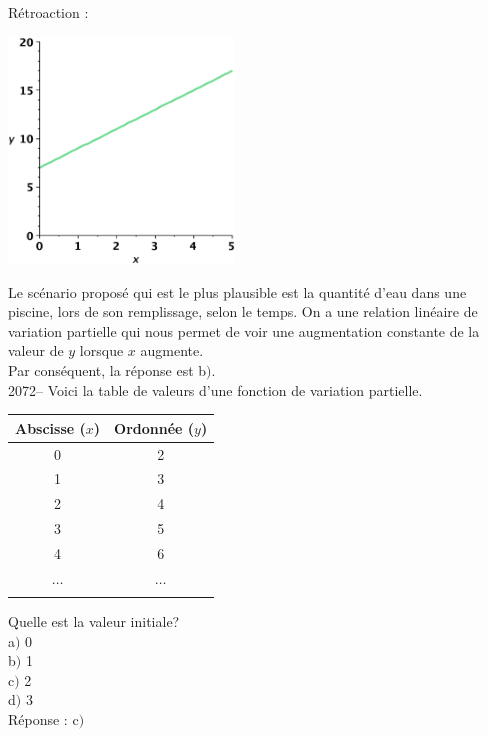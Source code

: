 \documentclass[letterpaper, 12pt]{article}
\begin{document}
R\'etroaction :\\
\begin{center}
 \includegraphics[width=6cm]{Q2071.eps}
\end{center}
Le sc\'enario propos\'e qui est le plus plausible est la quantit\'e d'eau dans une piscine, lors de son remplissage, selon le temps. On a une relation lin\'eaire de variation partielle qui nous permet de voir une augmentation constante de la valeur de $y$ lorsque $x$ augmente. \\
Par cons\'equent, la r\'eponse est b$)$.\\

2072-- Voici la table de valeurs d'une fonction de variation partielle.
\begin{center}
 \begin{tabular}{|c|c|} \hline
{\bf Abscisse ($x$)} & {\bf Ordonn\'ee ($y$)}  \\ \hline \hline
0 & 2 \\ \hline
1 & 3 \\ \hline
2 & 4 \\ \hline
3 & 5 \\ \hline
4 & 6 \\ \hline
$\ldots$ & $\ldots$ \\ \hline
\multicolumn{2}{c}{}\\
\end{tabular}
\end{center}
Quelle est la valeur initiale?\\

a$)$ 0\\
b$)$ 1\\
c$)$ 2\\
d$)$ 3\\

R\'eponse : c$)$\\
\end{document}
